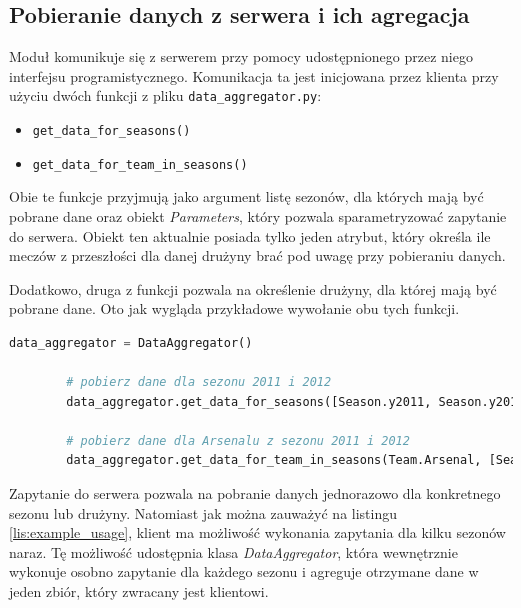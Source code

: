         \subsection{Pobieranie danych z serwera i ich agregacja}
        \noindent Moduł komunikuje się z serwerem przy pomocy udostępnionego przez niego interfejsu programistycznego. Komunikacja ta jest inicjowana przez klienta przy użyciu dwóch funkcji z pliku \texttt{data\_aggregator.py}:
        
        \begin{itemize}
            \item \texttt{get\_data\_for\_seasons()}
            \item \texttt{get\_data\_for\_team\_in\_seasons()}
        \end{itemize}
        
        Obie te funkcje przyjmują jako argument listę sezonów, dla których mają być pobrane dane oraz obiekt \emph{Parameters}, który pozwala sparametryzować zapytanie do serwera. Obiekt ten aktualnie posiada tylko jeden atrybut, który określa ile meczów z przeszłości dla danej drużyny brać pod uwagę przy pobieraniu danych.
        
        Dodatkowo, druga z funkcji pozwala na określenie drużyny, dla której mają być pobrane dane. Oto jak wygląda przykładowe wywołanie obu tych funkcji.
        
        \begin{lstlisting}[language=Python, label={lis:example_usage}, caption=Przykładowe wywołanie funkcji do pobrania danych]
        data_aggregator = DataAggregator()
        
        # pobierz dane dla sezonu 2011 i 2012
        data_aggregator.get_data_for_seasons([Season.y2011, Season.y2012], Parameters(no_last_matches=3))
        
        # pobierz dane dla Arsenalu z sezonu 2011 i 2012
        data_aggregator.get_data_for_team_in_seasons(Team.Arsenal, [Season.y2011, Season.y2012], Parameters(no_last_matches=3))
        \end{lstlisting}
        
        \noindent Zapytanie do serwera pozwala na pobranie danych jednorazowo dla konkretnego sezonu lub drużyny. Natomiast jak można zauważyć na listingu \ref{lis:example_usage}, klient ma możliwość wykonania zapytania dla kilku sezonów naraz. Tę możliwość udostępnia klasa \emph{DataAggregator}, która wewnętrznie wykonuje osobno zapytanie dla każdego sezonu i agreguje otrzymane dane w jeden zbiór, który zwracany jest klientowi.
        
